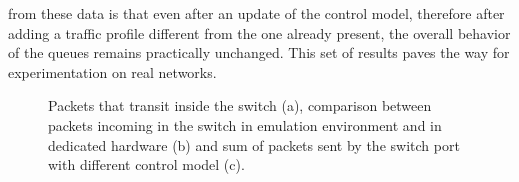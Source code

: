 from these data is that even after an update of the control model, therefore after adding a traffic profile different from the one already present, the overall behavior of the queues remains practically unchanged. This set of results paves the way for experimentation on real networks.
\begin{figure}[h!]
\centering
{}
\caption{Packets that transit inside the switch (a), comparison between packets incoming in the switch in emulation environment and in dedicated hardware (b) and sum of packets sent by the switch port with different control model (c).}
\label{fig:PKTS_REAL}
\end{figure}

